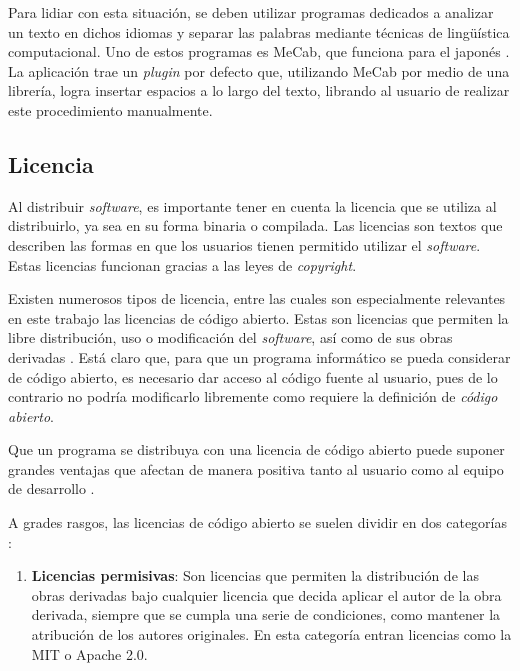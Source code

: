 Para lidiar con esta situación, se deben utilizar programas dedicados a analizar un texto en dichos idiomas y separar las palabras mediante técnicas de lingüística computacional. Uno de estos programas es MeCab, que funciona para el japonés \todo[referencia]. La aplicación trae un \textit{plugin} por defecto que, utilizando MeCab por medio de una librería, logra insertar espacios a lo largo del texto, librando al usuario de realizar este procedimiento manualmente.

\subsection{Licencia}

Al distribuir \textit{software}, es importante tener en cuenta la licencia que se utiliza al distribuirlo, ya sea en su forma binaria o compilada. Las licencias son textos que describen las formas en que los usuarios tienen permitido utilizar el \textit{software}. Estas licencias funcionan gracias a las leyes de \textit{copyright}.

Existen numerosos tipos de licencia, entre las cuales son especialmente relevantes en este trabajo las licencias de código abierto. Estas son licencias que permiten la libre distribución, uso o modificación del \textit{software}, así como de sus obras derivadas \citationNeeded. Está claro que, para que un programa informático se pueda considerar de código abierto, es necesario dar acceso al código fuente al usuario, pues de lo contrario no podría modificarlo libremente como requiere la definición de \textit{código abierto}.

Que un programa se distribuya con una licencia de código abierto puede suponer grandes ventajas que afectan de manera positiva tanto al usuario como al equipo de desarrollo \autocite{almarzouq2005open, Heron2013}.

A grades rasgos, las licencias de código abierto se suelen dividir en dos categorías \citationNeeded:

\begin{enumerate}
	\item \textbf{Licencias permisivas}: Son licencias que permiten la distribución de las obras derivadas bajo cualquier licencia que decida aplicar el autor de la obra derivada, siempre que se cumpla una serie de condiciones, como mantener la atribución de los autores originales. En esta categoría entran licencias como la MIT o Apache 2.0.
\end{enumerate}

